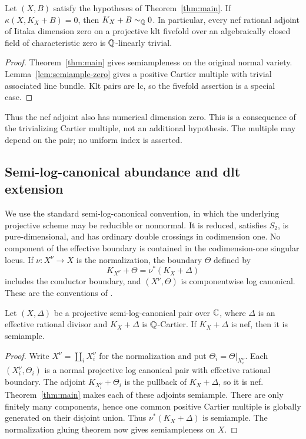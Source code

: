 \begin{corollary}\label{cor:qlinear-zero}
Let \((X,B)\) satisfy the hypotheses of Theorem~\ref{thm:main}.
If \(\kappa(X,K_X+B)=0\), then \(K_X+B\sim_{\mathbb{Q}}0\).
In particular, every nef rational adjoint of Iitaka dimension zero
on a projective klt fivefold over an algebraically closed field of
characteristic zero is \(\mathbb{Q}\)-linearly trivial.
\end{corollary}
\begin{proof}
Theorem~\ref{thm:main} gives semiampleness on the original normal
variety. Lemma~\ref{lem:semiample-zero} gives a positive Cartier
multiple with trivial associated line bundle. Klt pairs are lc, so
the fivefold assertion is a special case.
\end{proof}

Thus the nef adjoint also has numerical dimension zero. This is a
consequence of the trivializing Cartier multiple, not an additional
hypothesis. The multiple may depend on the pair; no uniform index is
asserted.

\subsection{Semi-log-canonical abundance and dlt extension}

We use the standard semi-log-canonical convention, in which the underlying
projective scheme may be reducible or nonnormal. It is reduced, satisfies
\(S_2\), is pure-dimensional, and has ordinary double crossings in
codimension one. No component of the effective boundary is contained in the
codimension-one singular locus. If \(\nu:X^\nu\to X\) is the normalization,
the boundary \(\Theta\)
defined by
\[
 K_{X^\nu}+\Theta=\nu^*(K_X+\Delta)
\]
includes the conductor boundary, and \((X^\nu,\Theta)\) is componentwise
log canonical.
These are the conventions of \cite[Definition~2.5]{FujinoGongyo2014}.

\begin{corollary}
\label{cor:slc-abundance}
Let \((X,\Delta)\) be a projective semi-log-canonical pair over \(\mathbb{C}\),
where \(\Delta\) is an effective rational divisor and \(K_X+\Delta\) is
\(\mathbb{Q}\)-Cartier. If \(K_X+\Delta\) is nef, then it is semiample.
\end{corollary}
\begin{proof}
Write \(X^\nu=\coprod_i X_i^\nu\) for the normalization and put
\(\Theta_i=\Theta|_{X_i^\nu}\). Each \((X_i^\nu,\Theta_i)\) is a normal
projective log canonical pair with effective rational boundary. The adjoint
\(K_{X_i^\nu}+\Theta_i\) is the pullback of \(K_X+\Delta\), so it is nef.
Theorem~\ref{thm:main} makes each of these adjoints semiample. There are only
finitely many components, hence one common positive Cartier multiple is
globally generated on their disjoint union. Thus \(\nu^*(K_X+\Delta)\) is
semiample. The normalization gluing theorem
\cite[Theorem~1.5]{FujinoGongyo2014} now gives semiampleness on \(X\).
\end{proof}

